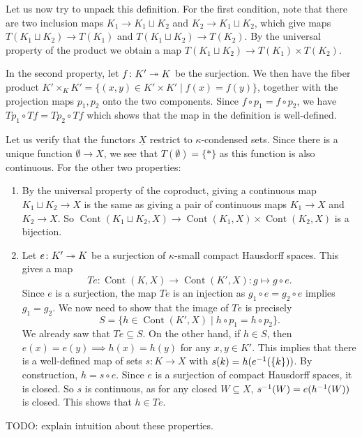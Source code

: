 \documentclass{article}
\DeclareMathOperator{\Cont}{Cont}
\begin{document}
Let us now try to unpack this definition.
For the first condition, note that there are two inclusion maps
$K_1 \to K_1 \sqcup K_2$ and $K_2 \to K_1 \sqcup K_2$, which give
maps $T(K_1 \sqcup K_2) \to T(K_1)$ and $T(K_1 \sqcup K_2) \to T(K_2)$.
By the universal property of the product we obtain a map
$T(K_1 \sqcup K_2) \to T(K_1) \times T(K_2)$.

In the second property, let $f\colon K' \twoheadrightarrow K$ be the surjection.
We then have the fiber product $K' \times_K K' = \{(x,y)\in K' \times K' \mid f(x) = f(y)\}$,
together with the projection maps $p_1, p_2$ onto the two components.
Since $f\circ p_1 = f \circ p_2$, we have $Tp_1 \circ Tf = Tp_2 \circ Tf$
which shows that the map in the definition is well-defined.

Let us verify that the functors $\underline{X}$ restrict
to $\kappa$-condensed sets. Since there is a unique function
$\emptyset \to X$, we see that $T(\emptyset) = \{*\}$ as this function
is also continuous. For the other two properties:
\begin{enumerate}
    \item By the universal property of the coproduct, giving
          a continuous map $K_1 \sqcup K_2 \to X$ is the same as giving
          a pair of
          continuous maps $K_1 \to X$ and $K_2 \to X$.
          So $\Cont(K_1 \sqcup K_2, X) \to \Cont(K_1, X) \times \Cont(K_2, X)$
          is a bijection.
    \item Let $e\colon K' \twoheadrightarrow K$ be a surjection of $\kappa$-small
          compact Hausdorff spaces. This gives a map
          \begin{equation*}
              Te \colon \Cont(K, X) \to \Cont(K', X) \colon g \mapsto g\circ e.
          \end{equation*}
          Since $e$ is a surjection, the map $Te$ is an injection as
          $g_1\circ e = g_2 \circ e$ implies $g_1 = g_2$. We now need
          to show that the image of $Te$ is precisely
          \begin{equation*}
              S = \{h \in \Cont(K' , X) \mid h\circ p_1 = h\circ p_2\}.
          \end{equation*}
          We already saw that $Te \subseteq S$. On the other hand,
          if $h \in S$, then $e(x) = e(y) \implies h(x) = h(y)$ for
          any $x,y\in K'$. This implies that there is a well-defined
          map of sets $s\colon K \to X$ with $s(k) = h(e^{-1}(\{k\}))$.
          By construction, $h = s\circ e$. Since $e$ is a surjection
          of compact Hausdorff spaces, it is closed. So $s$ is continuous,
          as for any closed $W \subseteq X$, $s^{-1}(W) = e(h^{-1}(W))$
          is closed. This shows that $h\in Te$.
\end{enumerate}
TODO: explain intuition about these properties.
\end{document}
